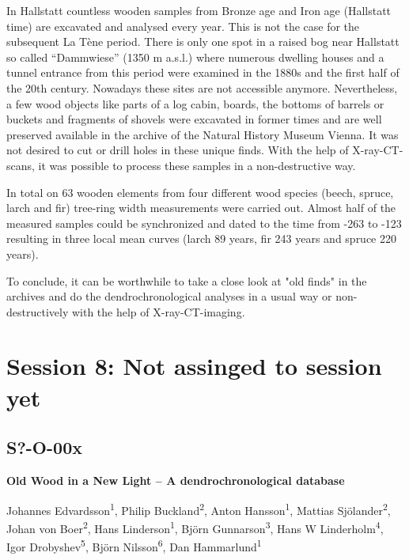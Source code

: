 \documentclass[
]{book}
\begin{document}
In Hallstatt countless wooden samples from Bronze age and Iron age (Hallstatt time) are excavated and analysed every year. This is not the case for the subsequent La Tène period. There is only one spot in a raised bog near Hallstatt so called ``Dammwiese'' (1350 m a.s.l.) where numerous dwelling houses and a tunnel entrance from this period were examined in the 1880s and the first half of the 20th century. Nowadays these sites are not accessible anymore. Nevertheless, a few wood objects like parts of a log cabin, boards, the bottoms of barrels or buckets and fragments of shovels were excavated in former times and are well preserved available in the archive of the Natural History Museum Vienna. It was not desired to cut or drill holes in these unique finds. With the help of X-ray-CT-scans, it was possible to process these samples in a non-destructive way.

In total on 63 wooden elements from four different wood species (beech, spruce, larch and fir) tree-ring width measurements were carried out. Almost half of the measured samples could be synchronized and dated to the time from -263 to -123 resulting in three local mean curves (larch 89 years, fir 243 years and spruce 220 years).

To conclude, it can be worthwhile to take a close look at "old finds" in the archives and do the dendrochronological analyses in a usual way or non-destructively with the help of X-ray-CT-imaging.

\hypertarget{session-8-not-assinged-to-session-yet}{%
\chapter*{Session 8: Not assinged to session yet}\label{session-8-not-assinged-to-session-yet}}

\hypertarget{s-o-00x}{%
\section*{S?-O-00x}\label{s-o-00x}}

\textbf{Old Wood in a New Light -- A dendrochronological database}

Johannes Edvardsson\textsuperscript{1}, Philip Buckland\textsuperscript{2}, Anton Hansson\textsuperscript{1}, Mattias Sjölander\textsuperscript{2}, Johan von Boer\textsuperscript{2}, Hans Linderson\textsuperscript{1}, Björn Gunnarson\textsuperscript{3}, Hans W Linderholm\textsuperscript{4}, Igor Drobyshev\textsuperscript{5}, Björn Nilsson\textsuperscript{6}, Dan Hammarlund\textsuperscript{1}
\end{document}
